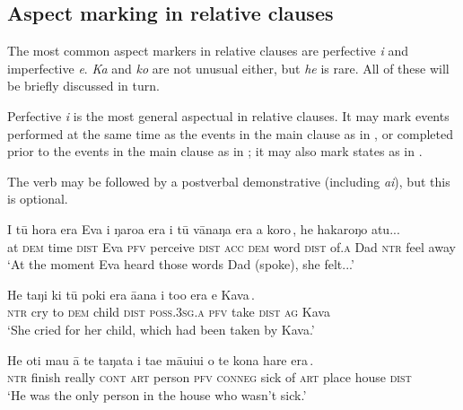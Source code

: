 \subsection{Aspect marking in relative clauses}\label{sec:11.4.3}
The most common aspect markers in relative clauses are perfective \textit{i} and imperfective \textit{e}. \textit{Ka} and \textit{ko} are not unusual either, but \textit{he} is rare. All of these will be briefly discussed in turn.

Perfective \textit{i} is the most general aspectual in relative clauses. It may mark events performed at the same time as the events in the main clause as in , or completed prior to the events in the main clause as in ; it may also mark states as in .

The verb may be followed by a postverbal demonstrative (including \textit{ai}), but this is optional.

\ea\label{ex:11.110}
\gll {\ꞌ}I tū hora era {\ob}Eva i ŋaro{\ꞌ}a era i tū vānaŋa era {\ꞌ}a koro\,{\cb},  he hakaroŋo atu...\\
at \textsc{dem} time \textsc{dist} {\db}Eva \textsc{pfv} perceive \textsc{dist} \textsc{acc} \textsc{dem} word \textsc{dist} of\textsc{.a} Dad  \textsc{ntr} feel away\\

\glt 
‘At the moment Eva heard those words Dad (spoke), she felt...’ \textstyleExampleref{[R210.075]} 
\z

\ea\label{ex:11.111}
\gll He taŋi ki tū poki era {\ꞌ}ā{\ꞌ}ana {\ob}i to{\ꞌ}o era e Kava\,{\cb}. \\
\textsc{ntr} cry to \textsc{dem} child \textsc{dist} \textsc{poss.3sg.a} {\db}\textsc{pfv} take \textsc{dist} \textsc{ag} Kava \\

\glt 
‘She cried for her child, which had been taken by Kava.’ \textstyleExampleref{[R229.095]} 
\z

\ea\label{ex:11.112}
\gll He oti mau {\ꞌ}ā te taŋata {\ob}i ta{\ꞌ}e māuiui o te kona hare era\,{\cb}.\\
\textsc{ntr} finish really \textsc{cont} \textsc{art} person {\db}\textsc{pfv} \textsc{conneg} sick of \textsc{art} place house \textsc{dist}\\

\glt 
‘He was the only person in the house who wasn’t sick.’ \textstyleExampleref{[R250.091]} 
\z

